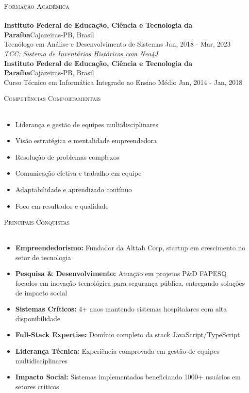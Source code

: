 \documentclass[a4paper]{article}
\newcommand{\lineunder}{
    \vspace*{-8pt} \\
    \hspace*{-18pt} \hrulefill \\
}
\newcommand{\header}[1]{
    {\hspace*{-18pt}\vspace*{6pt} \textsc{#1}}
    \vspace*{-6pt} \lineunder
}
\begin{document}
%
%
\header{Formação Acadêmica}
\vspace{2mm}
\textbf{Instituto Federal de Educação, Ciência e Tecnologia da Paraíba}\hfill Cajazeiras-PB, Brasil\\
Tecnólogo em Análise e Desenvolvimento de Sistemas \hfill Jan, 2018 - Mar, 2023\\
{\sl TCC: Sistema de Inventários Históricos com Neo4J }\\
\vspace{2mm}
\textbf{Instituto Federal de Educação, Ciência e Tecnologia da Paraíba}\hfill Cajazeiras-PB, Brasil\\
Curso Técnico em Informática Integrado ao Ensino Médio \hfill Jan, 2014 - Jan, 2018\\
\vspace{2mm}

%
%
\header{Competências Comportamentais}
\vspace{2mm}
\begin{itemize}[leftmargin=*]
    \item Liderança e gestão de equipes multidisciplinares
    \item Visão estratégica e mentalidade empreendedora
    \item Resolução de problemas complexos
    \item Comunicação efetiva e trabalho em equipe
    \item Adaptabilidade e aprendizado contínuo
    \item Foco em resultados e qualidade
\end{itemize}
\vspace{2mm}

%
%
\header{Principais Conquistas}
\vspace{2mm}
\begin{itemize}[leftmargin=*]
    \item \textbf{Empreendedorismo:} Fundador da Alttab Corp, startup em crescimento no setor de tecnologia
    \item \textbf{Pesquisa \& Desenvolvimento:} Atuação em projetos P\&D FAPESQ focados em inovação tecnológica para segurança pública, entregando soluções de impacto social
    \item \textbf{Sistemas Críticos:} 4+ anos mantendo sistemas hospitalares com alta disponibilidade
    \item \textbf{Full-Stack Expertise:} Domínio completo da stack JavaScript/TypeScript
    \item \textbf{Liderança Técnica:} Experiência comprovada em gestão de equipes multidisciplinares
    \item \textbf{Impacto Social:} Sistemas implementados beneficiando 1000+ usuários em setores críticos
\end{itemize}
\vspace{2mm}
\end{document}
